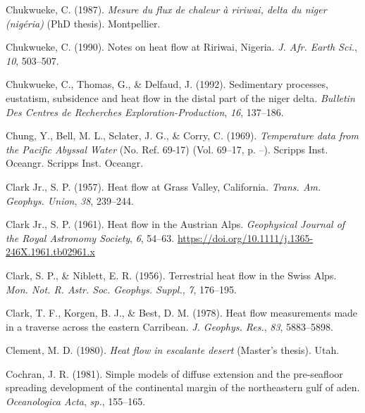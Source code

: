 \documentclass[draft,linenumbers]{agujournal2018}
\begin{document}
\leavevmode{}%
Chukwueke, C. (1987). \emph{Mesure du flux de chaleur à ririwai, delta
du niger (nigéria)} (PhD thesis). Montpellier.

\leavevmode{}%
Chukwueke, C. (1990). Notes on heat flow at {Ririwai, Nigeria}. \emph{J.
Afr. Earth Sci.}, \emph{10}, 503--507.

\leavevmode{}%
Chukwueke, C., Thomas, G., \& Delfaud, J. (1992). Sedimentary processes,
eustatism, subsidence and heat flow in the distal part of the niger
delta. \emph{Bulletin Des Centres de Recherches Exploration-Production},
\emph{16}, 137--186.

\leavevmode{}%
Chung, Y., Bell, M. L., Sclater, J. G., \& Corry, C. (1969).
\emph{Temperature data from the {Pacific Abyssal Water}} (No. Ref.
69-17) (Vol. 69--17, p. --). Scripps Inst. Oceangr. Scripps Inst.
Oceangr.

\leavevmode{}%
Clark Jr., S. P. (1957). Heat flow at {Grass Valley, California}.
\emph{Trans. Am. Geophys. Union}, \emph{38}, 239--244.

\leavevmode{}%
Clark Jr., S. P. (1961). Heat flow in the {Austrian Alps}.
\emph{Geophysical Journal of the Royal Astronomy Society}, \emph{6},
54--63. \url{https://doi.org/10.1111/j.1365-246X.1961.tb02961.x}

\leavevmode{}%
Clark, S. P., \& Niblett, E. R. (1956). Terrestrial heat flow in the
{Swiss Alps}. \emph{Mon. Not. R. Astr. Soc. Geophys. Suppl.}, \emph{7},
176--195.

\leavevmode{}%
Clark, T. F., Korgen, B. J., \& Best, D. M. (1978). Heat flow
measurements made in a traverse across the eastern {Carribean}. \emph{J.
Geophys. Res.}, \emph{83}, 5883--5898.

\leavevmode{}%
Clement, M. D. (1980). \emph{Heat flow in escalante desert} (Master's
thesis). Utah.

\leavevmode{}%
Cochran, J. R. (1981). Simple models of diffuse extension and the
pre-seafloor spreading development of the continental margin of the
northeastern gulf of aden. \emph{Oceanologica Acta}, \emph{sp.},
155--165.
\end{document}
